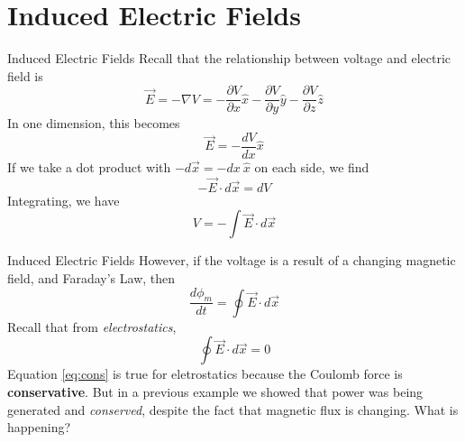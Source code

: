 \documentclass{beamer}
\begin{document}
\section{Induced Electric Fields}

\begin{frame}{Induced Electric Fields}
Recall that the relationship between voltage and electric field is
\begin{equation}
\vec{E} = - \nabla V = -\frac{\partial V}{\partial x}\hat{x}-\frac{\partial V}{\partial y}\hat{y}-\frac{\partial V}{\partial z}\hat{z}
\end{equation}
In one dimension, this becomes
\begin{equation}
\vec{E} = -\frac{dV}{dx}\hat{x}
\end{equation}
If we take a dot product with $- d\vec{x} = - dx ~ \hat{x}$ on each side, we find
\begin{equation}
-\vec{E} \cdot d\vec{x} = dV
\end{equation}
Integrating, we have
\begin{equation}
V = - \int \vec{E} \cdot d\vec{x}
\end{equation}
\end{frame}

\begin{frame}{Induced Electric Fields}
However, if the voltage is a result of a changing magnetic field, and Faraday's Law, then
\begin{equation}
\frac{d\phi_m}{dt} = \oint \vec{E} \cdot d\vec{x}
\end{equation}
Recall that from \textit{electrostatics},
\begin{equation}
\oint \vec{E} \cdot d\vec{x} = 0 \label{eq:cons}
\end{equation}
Equation \ref{eq:cons} is true for eletrostatics because the Coulomb force is \textbf{conservative}.  But in a previous example we showed that power was being generated and \textit{conserved}, despite the fact that magnetic flux is changing.  What is happening?
\end{frame}
\end{document}
